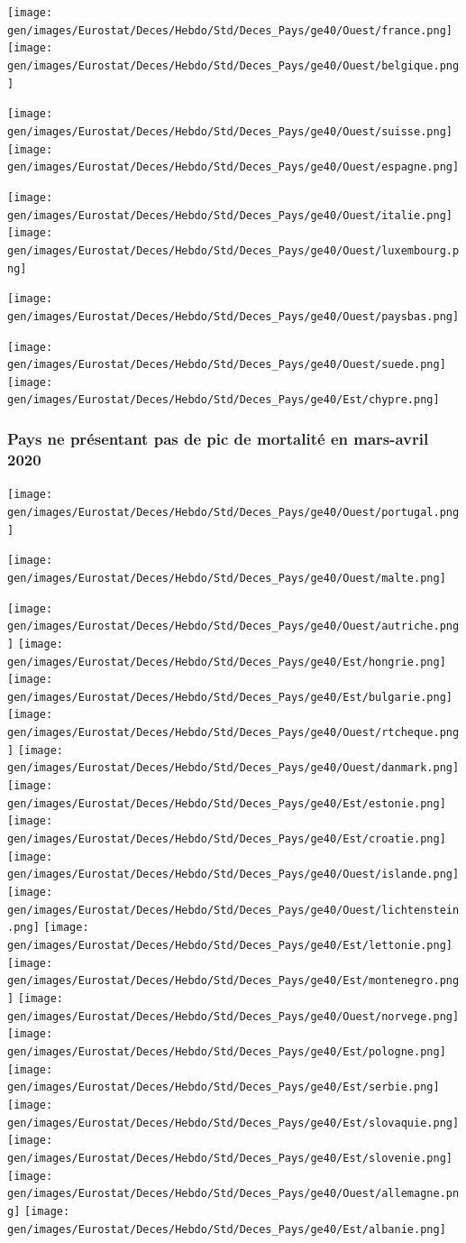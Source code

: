 \documentclass[
]{article}
\begin{document}
\texttt{[image: gen/images/Eurostat/Deces/Hebdo/Std/Deces\_Pays/ge40/Ouest/france.png]}
\texttt{[image: gen/images/Eurostat/Deces/Hebdo/Std/Deces\_Pays/ge40/Ouest/belgique.png]}

\texttt{[image: gen/images/Eurostat/Deces/Hebdo/Std/Deces\_Pays/ge40/Ouest/suisse.png]}
\texttt{[image: gen/images/Eurostat/Deces/Hebdo/Std/Deces\_Pays/ge40/Ouest/espagne.png]}

\texttt{[image: gen/images/Eurostat/Deces/Hebdo/Std/Deces\_Pays/ge40/Ouest/italie.png]}
\texttt{[image: gen/images/Eurostat/Deces/Hebdo/Std/Deces\_Pays/ge40/Ouest/luxembourg.png]}

\texttt{[image: gen/images/Eurostat/Deces/Hebdo/Std/Deces\_Pays/ge40/Ouest/paysbas.png]}

\texttt{[image: gen/images/Eurostat/Deces/Hebdo/Std/Deces\_Pays/ge40/Ouest/suede.png]}
\texttt{[image: gen/images/Eurostat/Deces/Hebdo/Std/Deces\_Pays/ge40/Est/chypre.png]}

\hypertarget{pays-ne-pruxe9sentant-pas-de-pic-de-mortalituxe9-en-mars-avril-2020}{%
\subsubsection{Pays ne présentant pas de pic de mortalité en mars-avril
2020}\label{pays-ne-pruxe9sentant-pas-de-pic-de-mortalituxe9-en-mars-avril-2020}}

\texttt{[image: gen/images/Eurostat/Deces/Hebdo/Std/Deces\_Pays/ge40/Ouest/portugal.png]}

\texttt{[image: gen/images/Eurostat/Deces/Hebdo/Std/Deces\_Pays/ge40/Ouest/malte.png]}

\texttt{[image: gen/images/Eurostat/Deces/Hebdo/Std/Deces\_Pays/ge40/Ouest/autriche.png]}
\texttt{[image: gen/images/Eurostat/Deces/Hebdo/Std/Deces\_Pays/ge40/Est/hongrie.png]}
\texttt{[image: gen/images/Eurostat/Deces/Hebdo/Std/Deces\_Pays/ge40/Est/bulgarie.png]}
\texttt{[image: gen/images/Eurostat/Deces/Hebdo/Std/Deces\_Pays/ge40/Ouest/rtcheque.png]}
\texttt{[image: gen/images/Eurostat/Deces/Hebdo/Std/Deces\_Pays/ge40/Ouest/danmark.png]}
\texttt{[image: gen/images/Eurostat/Deces/Hebdo/Std/Deces\_Pays/ge40/Est/estonie.png]}
\texttt{[image: gen/images/Eurostat/Deces/Hebdo/Std/Deces\_Pays/ge40/Est/croatie.png]}
\texttt{[image: gen/images/Eurostat/Deces/Hebdo/Std/Deces\_Pays/ge40/Ouest/islande.png]}
\texttt{[image: gen/images/Eurostat/Deces/Hebdo/Std/Deces\_Pays/ge40/Ouest/lichtenstein.png]}
\texttt{[image: gen/images/Eurostat/Deces/Hebdo/Std/Deces\_Pays/ge40/Est/lettonie.png]}
\texttt{[image: gen/images/Eurostat/Deces/Hebdo/Std/Deces\_Pays/ge40/Est/montenegro.png]}
\texttt{[image: gen/images/Eurostat/Deces/Hebdo/Std/Deces\_Pays/ge40/Ouest/norvege.png]}
\texttt{[image: gen/images/Eurostat/Deces/Hebdo/Std/Deces\_Pays/ge40/Est/pologne.png]}
\texttt{[image: gen/images/Eurostat/Deces/Hebdo/Std/Deces\_Pays/ge40/Est/serbie.png]}
\texttt{[image: gen/images/Eurostat/Deces/Hebdo/Std/Deces\_Pays/ge40/Est/slovaquie.png]}
\texttt{[image: gen/images/Eurostat/Deces/Hebdo/Std/Deces\_Pays/ge40/Est/slovenie.png]}
\texttt{[image: gen/images/Eurostat/Deces/Hebdo/Std/Deces\_Pays/ge40/Ouest/allemagne.png]}
\texttt{[image: gen/images/Eurostat/Deces/Hebdo/Std/Deces\_Pays/ge40/Est/albanie.png]}
\end{document}
